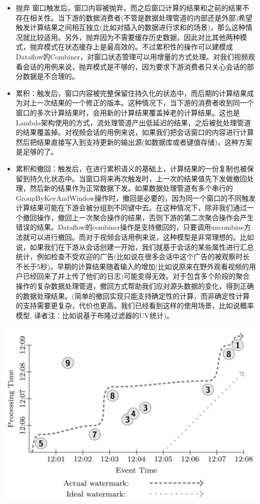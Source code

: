 \documentclass[oneside]{ctexbook}
\begin{document}
\begin{itemize}
\item 抛弃 窗口触发后，窗口内容被抛弃，而之后窗口计算的结果和之前的结果不存在相关性。当下游的数据消费者(不管是数据处理管道的内部还是外部)希望触发计算结果之间相互独立(比如对插入的数据进行求和的场景)，那么这种情况就比较适用。另外，抛弃因为不需要缓存历史数据，因此对比其他两种模式，抛弃模式在状态缓存上是最高效的。不过累积性的操作可以建模成Dataflow的Combiner，对窗口状态管理可以用增量的方式处理。对我们视频观看会话的用例来说，抛弃模式是不够的，因为要求下游消费者只关心会话的部分数据是不合理的。
\item 累积：触发后，窗口内容被完整保留住持久化的状态中，而后期的计算结果成为对上一次结果的一个修正的版本。这种情况下，当下游的消费者收到同一个窗口的多次计算结果时，会用新的计算结果覆盖掉老的计算结果。这也是Lambda架构使用的方式，流处理管道产出低延迟的结果，之后被批处理管道的结果覆盖掉。对视频会话的用例来说，如果我们把会话窗口的内容进行计算然后把结果直接写入到支持更新的输出源(如数据库或者键值存储)，这种方案是足够的了。
\item 累积和撤回：触发后，在进行累积语义的基础上，计算结果的一份复制也被保留到持久化状态中。当窗口将来再次触发时，上一次的结果值先下发做撤回处理，然后新的结果作为正常数据下发。如果数据处理管道有多个串行的GroupByKeyAndWindow操作时，撤回是必要的，因为同一个窗口的不同触发计算结果可能在下游会被分组到不同键中去。在这种情况下，除非我们通过一个撤回操作，撤回上一次聚合操作的结果，否则下游的第二次聚合操作会产生错误的结果。Dataflow的combiner操作是支持撤回的，只要调用uncombine方法就可以进行撤回。而对于视频会话用例来说，这种模型是非常理想的。比如说，如果我们在下游从会话创建一开始，我们就基于会话的某些属性进行汇总统计，例如检查不受欢迎的广告(比如说在很多会话中这个广告的被观察时长不长于5秒)。早期的计算结果随着输入的增加(比如说原来在野外观看视频的用户已经回来了并上传了他们的日志)可能变得无效。对于包含多个阶段的聚合操作的复杂数据处理管道，撤回方式帮助我们应对源头数据的变化，得到正确的数据处理结果。(简单的撤回实现只能支持确定性的计算，而非确定性计算的支持需要更复杂，代价也更高。我们已经看到这样的使用场景，比如说概率模型, 译者注：比如说基于布隆过滤器的UV统计)。
\end{itemize}

\noindent \includegraphics[width=\textwidth]{eventtime.png}
\end{document}
